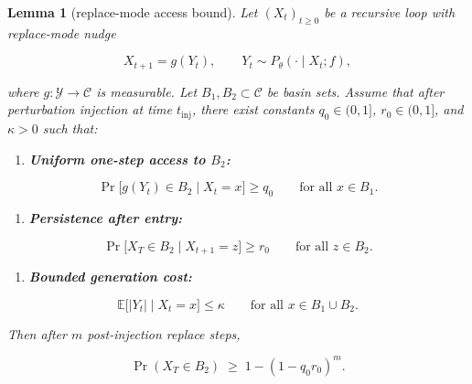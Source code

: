 \documentclass{article}
\theoremstyle{plain}
\newtheorem{lemma}{Lemma}
\theoremstyle{definition}
\begin{document}
\begin{lemma}[replace-mode access bound]
 Let $(X_t)_{t\ge 0}$ be a
recursive loop with replace-mode nudge

\begin{equation*}
X_{t+1} = g(Y_t), \qquad Y_t \sim P_\theta(\cdot \mid X_t; f),
\end{equation*}

where $g : \mathcal{Y} \to \mathcal{C}$ is measurable. Let
$B_1, B_2 \subset \mathcal{C}$ be basin sets. Assume that after
perturbation injection at time $t_{\mathrm{inj}}$, there exist
constants $q_0 \in (0, 1]$, $r_0 \in (0, 1]$, and $\kappa > 0$ such that:

\begin{enumerate}
  \item \textbf{Uniform one-step access to $B_2$:}
\end{enumerate}

\begin{equation*}
\Pr\bigl[g(Y_t) \in B_2 \mid X_t = x\bigr] \ge q_0
\qquad\text{for all } x \in B_1.
\end{equation*}

\begin{enumerate}
  \item \textbf{Persistence after entry:}
\end{enumerate}

\begin{equation*}
\Pr\bigl[X_T \in B_2 \mid X_{t+1} = z\bigr] \ge r_0
\qquad\text{for all } z \in B_2.
\end{equation*}

\begin{enumerate}
  \item \textbf{Bounded generation cost:}
\end{enumerate}

\begin{equation*}
\mathbb{E}\bigl[|Y_t| \mid X_t = x\bigr] \le \kappa
\qquad\text{for all } x \in B_1 \cup B_2.
\end{equation*}

Then after $m$ post-injection replace steps,

\begin{equation*}
\Pr(X_T \in B_2) \;\ge\; 1 - (1 - q_0 r_0)^m.
\end{equation*}
\end{lemma}
\end{document}
